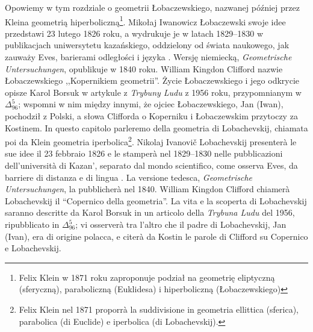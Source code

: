 Opowiemy w tym rozdziale o geometrii Łobaczewskiego, nazwanej później przez Kleina geometrią hiperboliczną\footnote{Felix Klein w 1871 roku zaproponuje podział na geometrię eliptyczną (sferyczną), paraboliczną (Euklidesa) i hiperboliczną (Łobaczewskiego)}. %
Mikołaj Iwanowicz Łobaczewski swoje idee przedstawi 23 lutego 1826 roku, a wydrukuje je w latach 1829--1830 w publikacjach uniwersytetu kazańskiego, oddzielony od świata naukowego, jak zauważy Eves, barierami odległości i języka \cite[s. 287]{eves1_1972}. %
Wersję niemiecką, \emph{Geometrische Untersuchungen}, opublikuje w 1840 roku. %
William Kingdon Clifford nazwie Łobaczewskiego ,,Kopernikiem geometrii''. %
Życie Łobaczewskiego i jego odkrycie opisze Karol Borsuk w artykule z \emph{Trybuny Ludu} z 1956 roku, przypomnianym w $\Delta_{96}^{5}$; wspomni w nim między innymi, że ojciec Łobaczewskiego, Jan (Iwan), pochodził z Polski, a słowa Clifforda o Koperniku i Łobaczewskim przytoczy za Kostinem. %
In questo capitolo parleremo della geometria di Lobachevskij, chiamata poi da Klein geometria iperbolica\footnote{Felix Klein nel 1871 proporrà la suddivisione in geometria ellittica (sferica), parabolica (di Euclide) e iperbolica (di Lobachevskij).}. %
Nikolaj Ivanovič Lobachevskij presenterà le sue idee il 23 febbraio 1826 e le stamperà nel 1829--1830 nelle pubblicazioni dell'università di Kazan', separato dal mondo scientifico, come osserva Eves, da barriere di distanza e di lingua \cite[p. 287]{eves1_1972}. %
La versione tedesca, \emph{Geometrische Untersuchungen}, la pubblicherà nel 1840. %
William Kingdon Clifford chiamerà Lobachevskij il ``Copernico della geometria''. %
La vita e la scoperta di Lobachevskij saranno descritte da Karol Borsuk in un articolo della \emph{Trybuna Ludu} del 1956, ripubblicato in $\Delta_{96}^{5}$; vi osserverà tra l'altro che il padre di Lobachevskij, Jan (Ivan), era di origine polacca, e citerà da Kostin le parole di Clifford su Copernico e Lobachevskij. %


